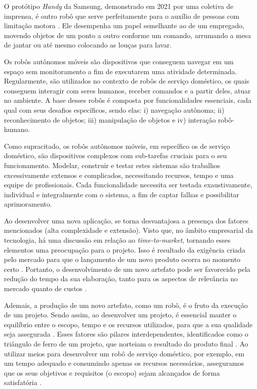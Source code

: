 O protótipo \textit{Handy} da Samsung, demonstrado em 2021 por uma coletiva de imprensa, é outro robô que serve perfeitamente para o auxílio de pessoas com limitação motora \cite{pressHandy}. Ele desempenha um papel semelhante ao de um empregado,  movendo objetos de um ponto a outro conforme um comando, arrumando a mesa de jantar ou  até mesmo colocando as louças para lavar. 

Os robôs autônomos móveis são dispositivos que conseguem navegar em um espaço sem monitoramento a fim de executarem uma atividade determinada. Regularmente, são utilizados no contexto de robôs de serviço doméstico, os quais conseguem interagir com seres humanos, receber comandos e a partir deles, atuar no ambiente. A base desses robôs é composta por funcionalidades essenciais, cada qual com seus desafios específicos, sendo elas: i) navegação autônoma; ii) reconhecimento de objetos; iii) manipulação de objetos e iv) interação robô-humano.

Como supracitado, os robôs autônomos móveis, em específico os de serviço doméstico, são dispositivos complexos com sub-tarefas cruciais para o seu funcionamento. Modelar, construir e testar estes sistemas são trabalhos excessivamente extensos e complicados, necessitando recursos, tempo e uma equipe de profissionais. Cada funcionalidade necessita ser testada exaustivamente, individual e integralmente com o sistema, a fim de captar falhas e possibilitar aprimoramento.

Ao desenvolver uma nova aplicação, se torna desvantajosa a presença dos fatores mencionados  (alta complexidade e extensão). Visto que, no âmbito empresarial da tecnologia, há uma discussão em relação ao \textit{time-to-market}, tornando esses elementos uma preocupação para o projeto. Isso é resultado da exigência criada pelo mercado para que o lançamento de um novo produto ocorra no momento certo \cite{ttmTradeOff:2021,npdTTM:1996, ttmConcurrent:2011}. Portanto, o desenvolvimento de um novo artefato pode ser favorecido pela redução do tempo da sua elaboração, tanto para os aspectos de relevância no mercado quanto de custos \cite{npdTTM:1996, ttmConcurrent:2011}.

Ademais, a produção de um novo artefato, como um robô, é o fruto da execução de um projeto. Sendo assim, ao desenvolver um projeto, é essencial manter o equilíbrio entre o escopo, tempo e os recursos utilizados, para que a sua qualidade seja assegurada \cite{pmbok}. Esses fatores são pilares interdependentes, identificados como o triângulo de ferro de um projeto, que norteiam o resultado do produto final \cite{pmbok}. Ao utilizar meios para desenvolver um robô de serviço doméstico, por exemplo, em um tempo adequado e consumindo apenas os recursos necessários, asseguramos que os seus objetivos e requisitos (o escopo) sejam alcançados de forma satisfatória \cite{pmbok}.  

